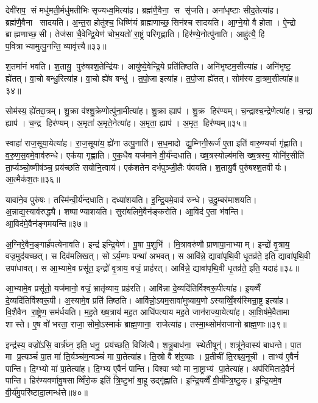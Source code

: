 देवी॑राप॒ सं मधु॑मती॒र्मधु॑मतीभिः सृज्यध्व॒मित्या॑ह। ब्रह्म॑णै॒वैना॒ स सृ॑जति। अना॑धृष्टाः सीद॒तेत्या॑ह। ब्रह्म॑णै॒वैना सादयति। अ॒न्त॒रा होतु॑श्च॒ धिष्णि॑यं ब्राह्मणाच्छ॒सिन॑श्च सादयति। आ॒ग्ने॒यो वै होता। ऐ॒न्द्रो ब्राह्मणाच्छ॒सी। तेज॑सा चै॒वेन्द्रि॒येण॑ चोभ॒यतो॑ रा॒ष्ट्रं परि॑गृह्णाति। हिर॑ण्ये॒नोत्पु॑नाति। आहु॑त्यै॒ हि प॒वित्राभ्यामुत्पु॒नन्ति॒ व्यावृ॑त्त्यै॥३३॥

श॒तमा॑नं भवति। श॒तायु॒ पुरु॑षश्श॒तेन्द्रि॑यः। आयु॑ष्ये॒वेन्द्रि॒ये प्रति॑तिष्ठति। अनि॑भृष्टम॒सीत्या॑ह। अनि॑भृष्ट॒ ह्ये॑तत्। वा॒चो बन्धु॒रित्या॑ह। वा॒चो ह्ये॑ष बन्धु॑। त॒पो॒जा इत्या॑ह। त॒पो॒जा ह्ये॑तत्। सोम॑स्य दा॒त्रम॒सीत्या॑ह॥३४॥

सोम॑स्य॒ ह्ये॑तद्दा॒त्रम्। शु॒क्रा व॑श्शु॒क्रेणोत्पु॑ना॒मीत्या॑ह। शु॒क्रा ह्याप॑। शु॒क्र हिर॑ण्यम्। च॒न्द्राश्च॒न्द्रेणेत्या॑ह। च॒न्द्रा ह्याप॑। च॒न्द्र हिर॑ण्यम्। अ॒मृता॑ अ॒मृते॒नेत्या॑ह। अ॒मृता॒ ह्याप॑। अ॒मृत॒ हिर॑ण्यम्॥३५॥

स्वाहा॑ राज॒सूया॒येत्या॑ह। रा॒ज॒सूया॑य॒ ह्ये॑ना उत्पु॒नाति॑। स॒ध॒मादो द्यु॒म्निनी॒रूर्ज॑ ए॒ता इति॑ वारु॒ण्यर्चा गृ॑ह्णाति। व॒रु॒ण॒स॒वमे॒वाव॑रुन्धे। एक॑या गृह्णाति। ए॒क॒धैव यज॑माने वी॒र्य॑न्दधाति। ख्ष॒त्रस्योल्ब॑मसि ख्ष॒त्रस्य॒ योनि॑र॒सीति॑ ता॒र्प्यञ्चो॒ष्णीष॑ञ्च॒ प्रय॑च्छति सयोनि॒त्वाय॑। एक॑शतेन दर्भपुञ्जी॒लैः प॑वयति। श॒तायु॒र्वै पुरु॑षश्श॒तवीर्यः। आ॒त्मैक॑श॒तः॥३६॥

यावा॑ने॒व पुरु॑षः। तस्मि॑न्वी॒र्य॑न्दधाति। दध्या॑शयति। इ॒न्द्रि॒यमे॒वाव॑ रुन्धे। उ॒दु॒म्बर॑माशयति। अ॒न्नाद्य॒स्याव॑रुद्ध्यै। शष्पाण्याशयति। सुरा॑बलिमे॒वैन॑ङ्करोति। आ॒विद॑ ए॒ता भ॑वन्ति। आ॒विद॑मे॒वैन॑ङ्गमयन्ति॥३७॥

अ॒ग्निरे॒वैन॒ङ्गार्\mbox{}ह॑पत्येनावति। इन्द्र॑ इन्द्रि॒येण॑। पू॒षा प॒शुभि॑। मि॒त्रावरु॑णौ प्राणापा॒नाभ्याम्। इन्द्रो॑ वृ॒त्राय॒ वज्र॒मुद॑यच्छत्। स दिव॑मलिखत्। सोऽर्य॒म्णः पन्था॑ अभवत्। स आवि॑न्ने॒ द्यावा॑पृथि॒वी धृ॒तव्र॑ते॒ इति॒ द्यावा॑पृथि॒वी उपा॑धावत्। स आ॒भ्यामे॒व प्रसू॑त॒ इन्द्रो॑ वृ॒त्राय॒ वज्रं॒ प्राह॑रत्। आवि॑न्ने॒ द्यावा॑पृथि॒वी धृ॒तव्र॑ते॒ इति॒ यदाह॑॥३८॥

आ॒भ्यामे॒व प्रसू॑तो॒ यज॑मानो॒ वज्रं॒ भ्रातृ॑व्याय॒ प्रह॑रति। आवि॑न्ना दे॒व्यदि॑तिर्विश्वरू॒पीत्या॑ह। इ॒यव्वैँ दे॒व्यदि॑तिर्विश्वरू॒पी। अ॒स्यामे॒व प्रति॑ तिष्ठति। आवि॑न्नो॒ऽयम॒सावा॑मुष्याय॒णोऽस्याव्विँ॒श्य॑स्मिन्रा॒ष्ट्र इत्या॑ह। वि॒शैवैन रा॒ष्ट्रेण॒ सम॑र्धयति। म॒ह॒ते ख्ष॒त्राय॑ मह॒त आधि॑पत्याय मह॒ते जान॑राज्या॒येत्या॑ह। आ॒शिष॑मे॒वैतामा शास्ते। ए॒ष वो॑ भरता॒ राजा॒ सोमो॒ऽस्माकं॑ ब्राह्म॒णाना॒ राजेत्या॑ह। तस्मा॒थ्सोम॑राजानो ब्राह्म॒णाः॥३९॥

इन्द्र॑स्य॒ वज्रो॑ऽसि॒ वार्त्र॑घ्न॒ इति॒ धनु॒ प्रय॑च्छति॒ विजि॑त्यै। श॒त्रु॒बाध॑ना॒ स्थेतीषून्॑। शत्रू॑ने॒वास्य॑ बाधन्ते। पा॒त मा प्र॒त्यञ्चं॑ पा॒त मा॑ ति॒र्यञ्च॑म॒न्वञ्चं॑ मा पा॒तेत्या॑ह। ति॒स्रो वै श॑र॒व्याः। प्र॒तीची॑ ति॒रश्च्य॒नूची। ताभ्य॑ ए॒वैनं॑ पान्ति। दि॒ग्भ्यो मा॑ पा॒तेत्या॑ह। दि॒ग्भ्य ए॒वैनं॑ पान्ति। विश्वाभ्यो मा ना॒ष्ट्राभ्य॑ पा॒तेत्या॑ह। अप॑रिमितादे॒वैनं॑ पान्ति। हिर॑ण्यवर्णावु॒षसाव्विँरो॒क इति॑ त्रि॒ष्टुभा॑ बा॒हू उद्गृ॑ह्णाति। इ॒न्द्रि॒यव्वैँ वी॒र्य॑न्त्रि॒ष्टुक्। इ॒न्द्रि॒यमे॒व वी॒र्य॑मु॒परि॑ष्टादा॒त्मन्ध॑त्ते॥४०॥\anuvakamend[व्यावृ॑त्त्यै दा॒त्रम॒सीत्या॑हा॒मृत॒ हिर॑ण्यमेकश॒तो ग॑मय॒न्त्याह॑ ब्राह्म॒णा ना॒ष्ट्राभ्य॑ पा॒तेत्या॑ह च॒त्वारि॑ च]

